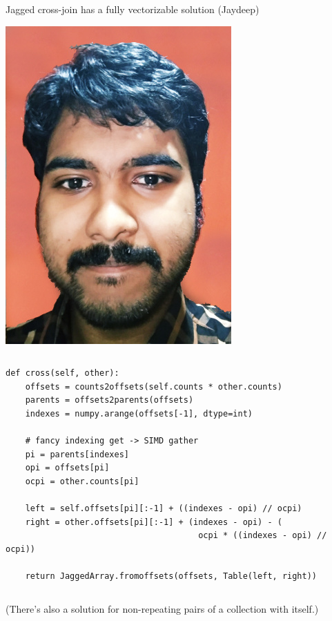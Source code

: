 \documentclass[aspectratio=169]{beamer}
\begin{document}
\begin{frame}[fragile]{Jagged cross-join has a fully vectorizable solution (Jaydeep)}
\small
\vspace{0.2 cm}

\hfill \mbox{\includegraphics[height=2.5 cm]{jaydeep.jpg}\hspace{-0.75 cm}}

\vspace{-2.7 cm}
\begin{columns}
\begin{verbatim}
def cross(self, other):
    offsets = counts2offsets(self.counts * other.counts)
    parents = offsets2parents(offsets)
    indexes = numpy.arange(offsets[-1], dtype=int)

    # fancy indexing get -> SIMD gather
    pi = parents[indexes]
    opi = offsets[pi]
    ocpi = other.counts[pi]

    left = self.offsets[pi][:-1] + ((indexes - opi) // ocpi)
    right = other.offsets[pi][:-1] + (indexes - opi) - (
                                       ocpi * ((indexes - opi) // ocpi))

    return JaggedArray.fromoffsets(offsets, Table(left, right))
\end{verbatim}
\end{columns}

\normalsize
\vspace{0.5 cm}
(There's also a solution for non-repeating pairs of a collection with itself.)
\end{frame}
\end{document}
